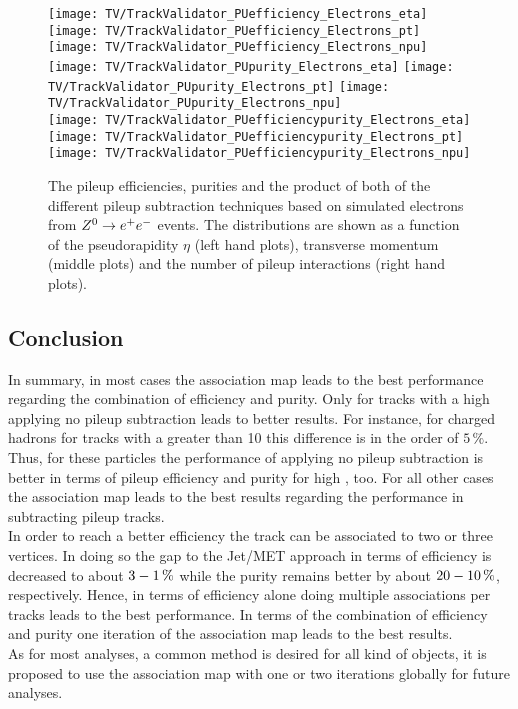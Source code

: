 \begin{figure}[Ht]
    \centering
    \texttt{[image: TV/TrackValidator\_PUefficiency\_Electrons\_eta]}
    \texttt{[image: TV/TrackValidator\_PUefficiency\_Electrons\_pt]}
    \texttt{[image: TV/TrackValidator\_PUefficiency\_Electrons\_npu]}
    \\
    \texttt{[image: TV/TrackValidator\_PUpurity\_Electrons\_eta]}
    \texttt{[image: TV/TrackValidator\_PUpurity\_Electrons\_pt]}
    \texttt{[image: TV/TrackValidator\_PUpurity\_Electrons\_npu]}
    \\
    \texttt{[image: TV/TrackValidator\_PUefficiencypurity\_Electrons\_eta]}
    \texttt{[image: TV/TrackValidator\_PUefficiencypurity\_Electrons\_pt]}
    \texttt{[image: TV/TrackValidator\_PUefficiencypurity\_Electrons\_npu]}
    \caption[Pileup efficiencies, purities and their product of the different pileup subtraction techniques based on simulated electrons from $\Zz\rightarrow\EE$ events]{The pileup efficiencies, purities and the product of both of the different pileup subtraction techniques based on simulated electrons from $\Zz\rightarrow\EE$ events. The distributions are shown as a function of the pseudorapidity $\eta$ (left hand plots), transverse momentum (middle plots) and the number of pileup interactions (right hand plots). \label{plot:TACOAElPileup}}
\end{figure}



\subsection{Conclusion \label{sec:TASEFRDAC}}

In summary, in most cases the association map leads to the best performance regarding the combination of efficiency and purity. Only for tracks with a high \pt{} applying no pileup subtraction leads to better results. For instance, for charged hadrons for tracks with a \pt{} greater than 10\GeV{} this difference is in the order of $5\,\%$. Thus, for these particles the performance of applying no pileup subtraction is better in terms of pileup efficiency and purity for high \pt{}, too. For all other cases the association map leads to the best results regarding the performance in subtracting pileup tracks. \\
In order to reach a better efficiency the track can be associated to two or three vertices. In doing so the gap to the Jet/MET approach in terms of efficiency is decreased to about $3\--1\,\%$ while the purity remains better by about $20\--10\,\%$, respectively. Hence, in terms of efficiency alone doing multiple associations per tracks leads to the best performance. In terms of the combination of efficiency and purity one iteration of the association map leads to the best results. \\
As for most analyses, a common method is desired for all kind of objects, it is proposed to use the association map with one or two iterations globally for future analyses.


